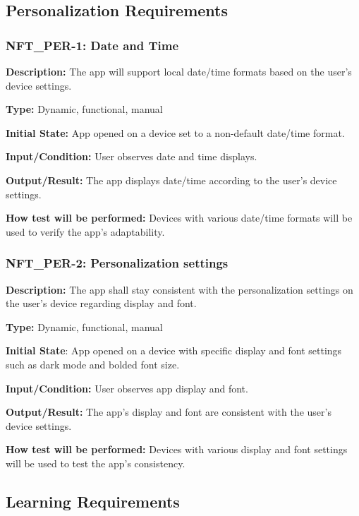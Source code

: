 \documentclass[12pt, titlepage]{article}
\begin{document}
\subsection{Personalization Requirements}


\subsubsection*{\textbf{NFT\_PER-1: Date and Time}
}

\textbf{Description: }The app will support local date/time formats based on the user’s device settings.

\textbf{Type: }Dynamic, functional, manual

\textbf{Initial State: }App opened on a device set to a non-default date/time format.

\textbf{Input/Condition: }User observes date and time displays.

\textbf{Output/Result: }The app displays date/time according to the user's device settings.

\textbf{How test will be performed:} Devices with various date/time formats will be used to verify the app's adaptability.


\subsubsection*{\textbf{NFT\_PER-2: Personalization settings}
}

\textbf{Description: }The app shall stay consistent with the personalization settings on the user’s device regarding display and font.

\textbf{Type:} Dynamic, functional, manual

\textbf{Initial State}: App opened on a device with specific display and font settings such as dark mode and bolded font size.

\textbf{Input/Condition: }User observes app display and font.

\textbf{Output/Result:} The app's display and font are consistent with the user’s device settings.

\textbf{How test will be performed:} Devices with various display and font settings will be used to test the app's consistency.
\newline
\subsection{Learning Requirements}
\end{document}
